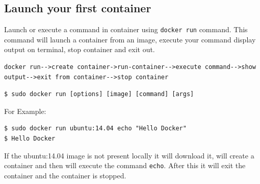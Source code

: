 \documentclass[11pt]{article}
\begin{document}
\subsection{Launch your first container}
\label{sec:orgheadline8}
Launch or execute a command in container using \texttt{docker run} command. This
command will launch a container from an image, execute your command 
display output on terminal, stop container and  exit out.

\begin{verbatim}
docker run-->create container->run-container-->execute command-->show
output-->exit from container-->stop container
\end{verbatim}

\begin{verbatim}
$ sudo docker run [options] [image] [command] [args]
\end{verbatim}
For Example:
\begin{verbatim}
$ sudo docker run ubuntu:14.04 echo "Hello Docker"
$ Hello Docker
\end{verbatim}
If the ubuntu:14.04 image is not present locally it will download it, will
create a container and then will execute the command \texttt{echo}. After this it
will exit the container and the container is stopped.
\end{document}
